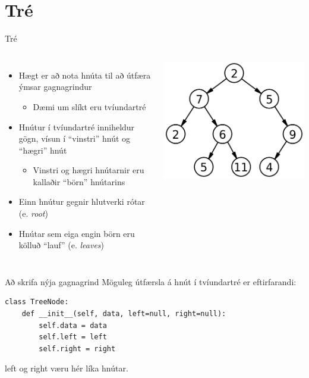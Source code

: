 \documentclass{beamer}
\begin{document}
\section{Tré}

\begin{frame}{Tré}
\begin{columns}[c]
\begin{itemize}
 \item Hægt er að nota hnúta til að útfæra ýmsar gagnagrindur
 \begin{itemize}
  \item Dæmi um slíkt eru tvíundartré
 \end{itemize}
  \item Hnútur í tvíundartré inniheldur gögn, vísun í ``vinstri'' hnút og ``hægri'' hnút
 \begin{itemize}
  \item Vinstri og hægri hnútarnir eru kallaðir ``börn'' hnútarins
 \end{itemize}
 \item Einn hnútur gegnir hlutverki rótar (e. \emph{root})
 \item Hnútar sem eiga engin börn eru kölluð ``lauf'' (e. \emph{leaves})
\end{itemize}
\includegraphics[width=\linewidth]{Pics/binary-tree}
\end{columns}
\end{frame}

\begin{frame}[fragile]{Að skrifa nýja gagnagrind}
Möguleg útfærsla á hnút í tvíundartré er eftirfarandi:
\begin{verbatim}
class TreeNode:
    def __init__(self, data, left=null, right=null):
        self.data = data
        self.left = left
        self.right = right
\end{verbatim}

left og right væru hér líka hnútar.
\end{frame}
\end{document}
